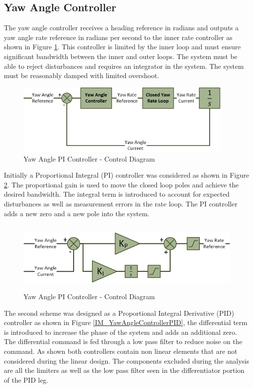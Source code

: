 \documentclass[12pt]{report}
\begin{document}
\subsection{Yaw Angle Controller}	
The yaw angle controller receives a heading reference in radians and outputs a yaw angle rate reference in radians per second to the inner rate controller as shown in Figure \ref{IM_YawAngleLoop}. This controller is limited by the inner loop and must ensure significant bandwidth between the inner and outer loops. The system must be able to reject disturbances and requires an integrator in the system. The system must be reasonably damped  with limited overshoot.

\begin{figure}[H]
	\centering
	\includegraphics[height = 3.5cm]{../References/Diagrams/YawAngleLoop.jpg}
	\caption{Yaw Angle PI Controller -  Control Diagram}
	\label{IM_YawAngleLoop}
\end{figure}

Initially a Proportional Integral (PI) controller was considered as shown in Figure \ref{IM_YawAngleController}. The proportional gain is used to move the closed loop poles and achieve the desired bandwidth. The integral term is introduced to account for expected disturbances as well as measurement errors in the rate loop. The PI controller adds a new zero and a new pole into the system. 

\begin{figure}[H]
	\centering
	\includegraphics[height = 3.5cm]{../References/Diagrams/YawAngleControllerPI.jpg}
	\caption{Yaw Angle PI Controller -  Control Diagram}
	\label{IM_YawAngleController}
\end{figure}

The second scheme was designed as a Proportional Integral Derivative (PID) controller as shown in Figure \ref{IM_YawAngleControllerPID}, the differential term is introduced to increase the phase of the system and adds an additional zero. The differential command is fed through a low pass filter to reduce noise on the command. As shown both controllers contain non linear elements that are not considered during the linear design. The components excluded during the analysis are all the limiters as well as the low pass filter seen in the differentiator portion of the PID leg.
\end{document}
